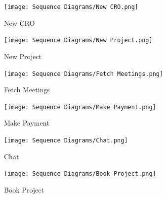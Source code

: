 \newpage
\begin{figure}[H]
	\begin{center}
		{\texttt{[image: Sequence Diagrams/New CRO.png]}}
		\caption{New CRO}
	\end{center}
\end{figure}

\newpage
\begin{figure}[H]
	\begin{center}
		{\texttt{[image: Sequence Diagrams/New Project.png]}}
		\caption{New Project}
	\end{center}
\end{figure}

\begin{figure}[H]
	\begin{center}
		{\texttt{[image: Sequence Diagrams/Fetch Meetings.png]}}
		\caption{Fetch Meetings}
	\end{center}
\end{figure}

\newpage
\begin{figure}[H]
	\begin{center}
		{\texttt{[image: Sequence Diagrams/Make Payment.png]}}
		\caption{Make Payment}
	\end{center}
\end{figure}

\begin{figure}[H]
	\begin{center}
		{\texttt{[image: Sequence Diagrams/Chat.png]}}
		\caption{Chat}
	\end{center}
\end{figure}

\newpage
\begin{figure}[H]
	\begin{center}
		{\texttt{[image: Sequence Diagrams/Book Project.png]}}
		\caption{Book Project}
	\end{center}
\end{figure}


\newpage
